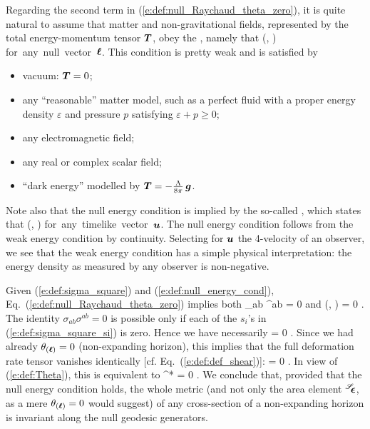 {{Regarding the second term in (\ref{e:def:null_Raychaud_theta_zero}), it
is quite natural to assume that matter and non-gravitational fields,
represented by the total energy-momentum tensor $\bm{T}$, obey the
,
namely that
\be \label{e:def:null_energy_cond}
    (\wl, \wl)  \quad \mbox{for any null vector $\wl$}.
\ee
This condition is pretty weak and is satisfied by
\begin{itemize}
\item vacuum: $\bm{T}=0$;
\item any ``reasonable'' matter model, such as a perfect fluid with a
proper energy density $\varepsilon$ and pressure $p$ satisfying
$\varepsilon+p\geq 0$;
\item any electromagnetic field;
\item any real or complex scalar field;
\item ``dark energy'' modelled by $\bm{T} = -\frac{\Lambda}{8\pi}\, \bm{g}$.
\end{itemize}
Note also that the null energy condition is implied by the
so-called ,
which states that
\be
    (, )  \quad \mbox{for any timelike vector $\w{u}$}.
\ee
The null energy condition follows from the
weak energy condition by continuity.
Selecting for $\bm{u}$ the 4-velocity of an observer, we see that
the weak energy condition has a simple physical interpretation: the energy
density as measured by any observer is non-negative.

Given (\ref{e:def:sigma_square}) and (\ref{e:def:null_energy_cond}),
Eq.~(\ref{e:def:null_Raychaud_theta_zero})  implies both
\be
    \sigma_{ab} \sigma^{ab}  = 0
\ee
and
\be \label{e:def:T_l_l_zero}
    (\wl, \wl) = 0 .
\ee
The identity $\sigma_{ab} \sigma^{ab} = 0$ is possible only if each of
the $s_i$'s in (\ref{e:def:sigma_square_si}) is zero. Hence we have necessarily
\be
    \w{\sigma} = 0 .
\ee
Since we had already $\theta_{(\bm{\ell})}=0$ (non-expanding horizon), this implies that the full deformation rate tensor
vanishes identically [cf. Eq.~(\ref{e:def:def_shear})]:
\be
    \w{\Theta} = 0 .
\ee
In view of (\ref{e:def:Theta}), this is equivalent to
\be \label{e:def:Lie_el_q_zero}
     ^* \Lie{\el}  = 0 .
\ee
We conclude that, provided that the null energy condition holds,
the whole metric (and not only the area element
${}^{\mathscr{S}}\!\!\bm{\epsilon}$, as a mere $\theta_{(\bm{\ell})}=0$ would suggest) of any cross-section
of a non-expanding horizon is invariant along the null geodesic generators.

}}
